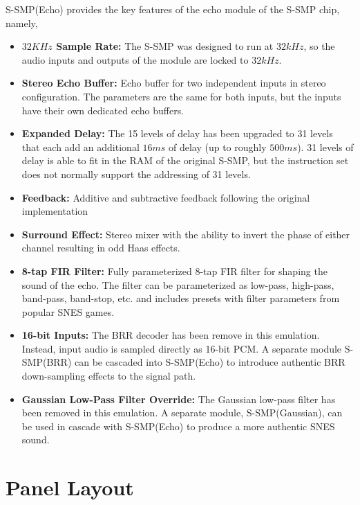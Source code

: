 \documentclass[12pt,letter]{article}
\begin{document}
S-SMP(Echo) provides the key features of the echo module of the S-SMP chip,
namely,
\begin{itemize}
  \item \textbf{$32KHz$ Sample Rate:} The S-SMP was designed to run at $32kHz$, so the audio inputs and outputs of the module are locked to $32kHz$.
  \item \textbf{Stereo Echo Buffer:} Echo buffer for two independent inputs in stereo configuration. The parameters are the same for both inputs, but the inputs have their own dedicated echo buffers.
  \item \textbf{Expanded Delay:} The 15 levels of delay has been upgraded to 31 levels that each add an additional $16ms$ of delay (up to roughly $500ms$). 31 levels of delay is able to fit in the RAM of the original S-SMP, but the instruction set does not normally support the addressing of 31 levels.
  \item \textbf{Feedback:} Additive and subtractive feedback following the original implementation
  \item \textbf{Surround Effect:} Stereo mixer with the ability to invert the phase of either channel resulting in odd Haas effects.
  \item \textbf{8-tap FIR Filter:} Fully parameterized 8-tap FIR filter for shaping the sound of the echo. The filter can be parameterized as low-pass, high-pass, band-pass, band-stop, etc. and includes presets with filter parameters from popular SNES games.
  \item \textbf{16-bit Inputs:} The BRR decoder has been remove in this emulation. Instead, input audio is sampled directly as 16-bit PCM. A separate module S-SMP(BRR) can be cascaded into S-SMP(Echo) to introduce authentic BRR down-sampling effects to the signal path.
  \item \textbf{Gaussian Low-Pass Filter Override:} The Gaussian low-pass filter has been removed in this emulation. A separate module, S-SMP(Gaussian), can be used in cascade with S-SMP(Echo) to produce a more authentic SNES sound.
\end{itemize}


\clearpage
\section*{Panel Layout}
\end{document}
